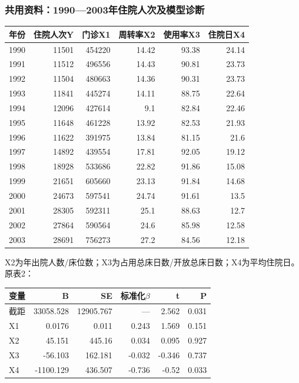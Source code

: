 \subsubsection*{共用资料：1990—2003年住院人次及模型诊断}

\begin{center}\small\setlength{\tabcolsep}{3.5pt}\renewcommand{\arraystretch}{1.18}\begin{tabular}{@{}lrrrrr@{}}
\toprule
年份 & 住院人次Y & 门诊X1 & 周转率X2 & 使用率X3 & 住院日X4 \\
\midrule

1990 & 11501 & 454220 & 14.42 & 93.38 & 24.14 \\
1991 & 11512 & 496556 & 14.43 & 90.81 & 23.73 \\
1992 & 11504 & 480663 & 14.36 & 90.31 & 23.73 \\
1993 & 11841 & 445274 & 14.11 & 88.75 & 22.64 \\
1994 & 12096 & 427614 & 9.1 & 82.84 & 22.46 \\
1995 & 11648 & 461228 & 13.92 & 82.53 & 21.93 \\
1996 & 11622 & 391975 & 13.84 & 81.15 & 21.6 \\
1997 & 14892 & 439554 & 17.81 & 92.05 & 19.12 \\
1998 & 18928 & 533686 & 22.82 & 91.86 & 15.08 \\
1999 & 21651 & 605660 & 23.13 & 91.84 & 14.68 \\
2000 & 24673 & 597541 & 24.74 & 91.61 & 13.5 \\
2001 & 28305 & 592311 & 25.1 & 88.63 & 12.7 \\
2002 & 27864 & 590564 & 24.6 & 85.98 & 12.58 \\
2003 & 28691 & 756273 & 27.2 & 84.56 & 12.18 \\
\bottomrule\end{tabular}\end{center}

X2为年出院人数/床位数；X3为占用总床日数/开放总床日数；X4为平均住院日。原表2：

\begin{center}\small\setlength{\tabcolsep}{3.5pt}\renewcommand{\arraystretch}{1.18}\begin{tabular}{@{}lrrrrr@{}}
\toprule
变量 & B & SE & 标准化\(\beta\) & t & P \\
\midrule

截距 & 33058.528 & 12905.767 & --- & 2.562 & 0.031 \\
X1 & 0.0176 & 0.011 & 0.243 & 1.569 & 0.151 \\
X2 & 45.151 & 445.16 & 0.034 & 0.095 & 0.927 \\
X3 & -56.103 & 162.181 & -0.032 & -0.346 & 0.737 \\
X4 & -1100.129 & 436.507 & -0.736 & -0.52 & 0.033 \\
\bottomrule\end{tabular}\end{center}

